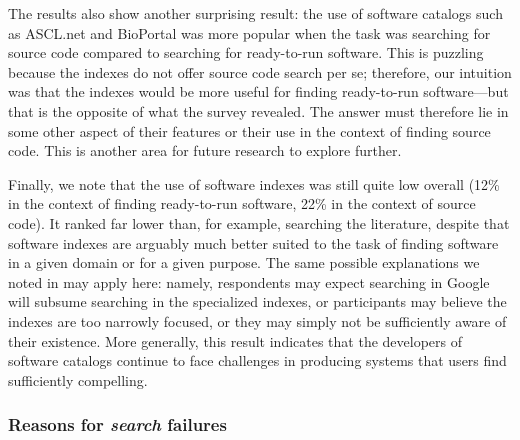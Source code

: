\documentclass{casicswhitepaper}
\begin{document}
The results also show another surprising result: the use of software catalogs such as ASCL.net and BioPortal was more popular when the task was searching for source code compared to searching for ready-to-run software.  This is puzzling because the indexes do not offer source code search per se; therefore, our intuition was that the indexes would be more useful for finding ready-to-run software---but that is the opposite of what the survey revealed.  The answer must therefore lie in some other aspect of their features or their use in the context of finding source code. This is another area for future research to explore further.

Finally, we note that the use of software indexes was still quite low overall (12\% in the context of finding ready-to-run software, 22\% in the context of source code).  It ranked far lower than, for example, searching the literature, despite that software indexes are arguably much better suited to the task of finding software in a given domain or for a given purpose.  The same possible explanations we noted in  may apply here: namely, respondents may expect searching in Google will subsume searching in the specialized indexes, or participants may believe the indexes are too narrowly focused, or they may simply not be sufficiently aware of their existence.  More generally, this result indicates that the developers of software catalogs continue to face challenges in producing systems that users find sufficiently compelling.




\subsubsection{Reasons for \emph{search} failures}
\label{reasons-for-search-failure}
\end{document}
